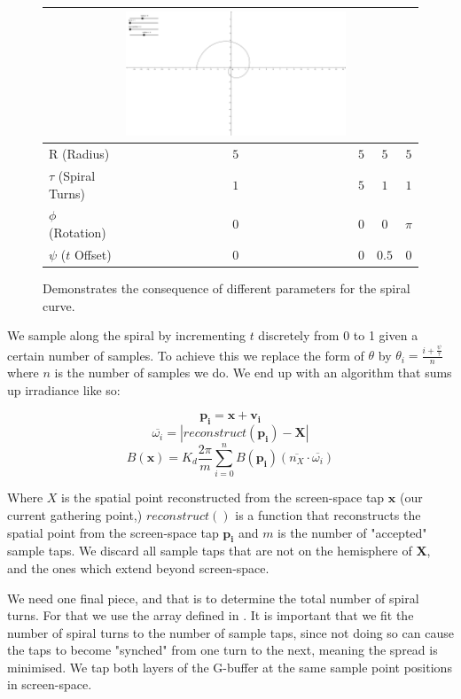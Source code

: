 \begin{figure}[!ht]
\begin{tabular} {| l | c | c | c | c |}
&
\includegraphics[scale=0.2,trim={10cm 4.65cm 11.3cm 3.0cm},clip]{img/spiral/pioffset}
\\
\hline
R (Radius) & $5$ & $5$ & $5$ & $5$ \\
\hline
$\tau$ (Spiral Turns) & $1$ & $5$ & $1$ & $1$ \\
\hline
$\phi$ (Rotation) & $0$ & $0$ & $0$ & $\pi$ \\
\hline
$\psi$ ($t$ Offset) & $0$ & $0$ & $0.5$ & $0$ \\
\hline
\end{tabular}
\caption{Demonstrates the consequence of different parameters for the spiral curve.}
\label{fig-spiralparam}
\end{figure}

We sample along the spiral by incrementing $t$ discretely from 0 to 1 given a certain number of samples. To achieve this we replace the form of $\theta$ by $\theta_i = \frac{i + \frac{\psi}{\tau}}{n}$ where $n$ is the number of samples we do. We end up with an algorithm that sums up irradiance like so:

$$\mathbf{p_i} = \mathbf{x} + \mathbf{v_i}$$
$$\overline{\omega_i} = | reconstruct(\mathbf{p_i}) - \mathbf{X} |$$
$$B(\mathbf{x}) = K_d \frac{2\pi}{m} \sum_{i = 0}^{n} B(\mathbf{p_i}) (\overline{n_X} \cdot \overline{\omega_i})$$

Where $X$ is the spatial point reconstructed from the screen-space tap $\mathbf{x}$ (our current gathering point,) $reconstruct()$ is a function that reconstructs the spatial point from the screen-space tap $\mathbf{p_i}$ and $m$ is the number of "accepted" sample taps. We discard all sample taps that are not on the hemisphere of $\mathbf{X}$, and the ones which extend beyond screen-space.

We need one final piece, and that is to determine the total number of spiral turns. For that we use the array defined in \cite{deep-g-buffer}. It is important that we fit the number of spiral turns to the number of sample taps, since not doing so can cause the taps to become "synched" from one turn to the next, meaning the spread is minimised. We tap both layers of the G-buffer at the same sample point positions in screen-space.

